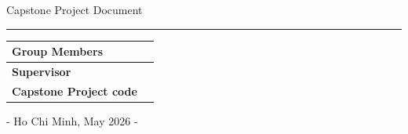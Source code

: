 \begin{titlepage}
\centering

\vspace*{5cm}

{\Huge Capstone Project Document}

\vspace{0.3cm}
\hrule
\vspace{2cm}

\begin{tabular}{|p{5cm}|p{8cm}|}
\hline
\textbf{Group Members} &  \\
\hline
\textbf{Supervisor} &  \\
\hline
\textbf{Capstone Project code} &  \\
\hline
\end{tabular}

\vfill

- Ho Chi Minh, May 2026 -

\end{titlepage}